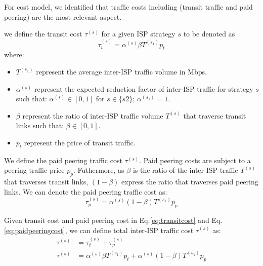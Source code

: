 \documentclass[paper]{ieice}
\begin{document}
For cost model, we identified that traffic costs including (transit traffic and paid peering) are the most relevant aspect. 
\newtheorem{theorem3}{Definition}
\begin{theorem}
we define the transit cost $\tau^{(s)}$ for a given ISP strategy $s$ to be denoted as 
\begin{equation}\label{eq:transitcost}
	\tau^{(s)}_t = \alpha^{(s)} \beta T^{(s_1)} p_t
\end{equation}
where:
\begin{itemize}
	\item $T^{(s_1)}$ represent the average inter-ISP traffic volume in Mbps.
	\item $\alpha^{(s)}$ represent the expected reduction factor of inter-ISP traffic for strategy $s$ such that: $\alpha^{(s)} \in [0,1]$ for $s \in \{s2\}$;  $\alpha^{(s_1)} = 1$.
	\item $\beta$ represent the ratio of inter-ISP traffic volume $T^{(s)}$ that traverse transit links such that: $\beta \in [0,1]$.
	\item $p_t$ represent the price of transit traffic.
\end{itemize}
\end{theorem}

\newtheorem{theorem4}{Definition}
\begin{theorem}
We define the paid peering traffic cost $\tau^{(s)}$. 
Paid peering costs are subject to a peering traffic price $p_p$.
Futhermore, as $\beta$ is the ratio of the inter-ISP traffic $T^{(s)}$ that traverses transit links, $(1-\beta)$ express the ratio that traverses paid peering links.
We can denote the paid peering traffic cost as:
\begin{equation}\label{eq:paidpeeringcost}
	\tau^{(s)}_p = \alpha^{(s)} (1-\beta) T^{(s_1)} p_p
\end{equation}
\end{theorem}

\newtheorem{theorem5}{Definition}
\begin{theorem}
Given transit cost and paid peering cost in Eq.\ref{eq:transitcost} and Eq.\ref{eq:paidpeeringcost}, we can define total inter-ISP traffic cost $\tau^{(s)}$ as:
\begin{align}
	\tau^{(s)} &= \tau^{(s)}_t + \tau^{(s)}_p \\
	\tau^{(s)} &= \alpha^{(s)} \beta T^{(s_1)} p_t + \alpha^{(s)} (1-\beta) T^{(s_1)} p_p
\end{align}
\end{theorem}
\end{document}
